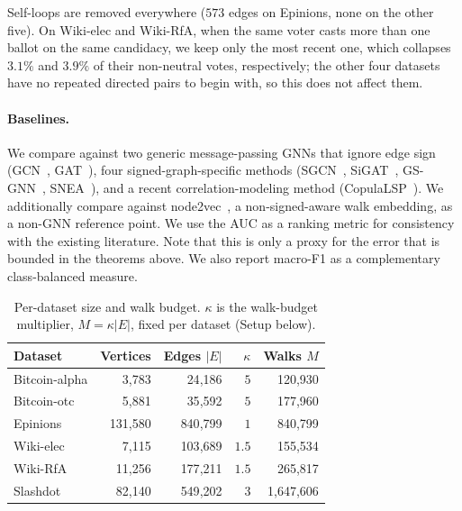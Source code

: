 \documentclass[sigconf]{acmart}
\theoremstyle{plain}
\theoremstyle{definition}
\begin{document}
Self-loops are removed everywhere ($573$ edges on Epinions, none on the other five). On Wiki-elec and Wiki-RfA, when the same voter casts more than one ballot on the same candidacy, we keep only the most recent one, which collapses $3.1\%$ and $3.9\%$ of their non-neutral votes, respectively; the other four datasets have no repeated directed pairs to begin with, so this does not affect them.

\paragraph{Baselines.} We compare against two generic message-passing GNNs that ignore edge sign (GCN~\citep{kipf2017semi}, GAT~\citep{velickovic2018graph}), four signed-graph-specific methods (SGCN~\citep{derr2018signed}, SiGAT~\citep{huang2019signed}, GS-GNN~\citep{liu2021signed}, SNEA~\citep{li2020learning}), and a recent correlation-modeling method (CopulaLSP~\citep{sung2026scalable}). We additionally compare against node2vec~\citep{grover2016node2vec}, a non-signed-aware walk embedding, as a non-GNN reference point. We use the AUC as a ranking metric for consistency with the existing literature. Note that this is only a proxy for the error that is bounded in the theorems above. We also report macro-F1 as a complementary class-balanced measure.

\begin{table}[h!]
\centering
\small
\caption{Per-dataset size and walk budget. $\kappa$ is the walk-budget multiplier, $M=\kappa|E|$, fixed per dataset (Setup below).}
\label{tab:dataset-walks}
\begin{tabular}{lrrrr}
\toprule
Dataset & Vertices & Edges $|E|$ & $\kappa$ & Walks $M$ \\
\midrule
Bitcoin-alpha & 3{,}783 & 24{,}186 & $5$ & 120{,}930 \\
Bitcoin-otc & 5{,}881 & 35{,}592 & $5$ & 177{,}960 \\
Epinions & 131{,}580 & 840{,}799 & $1$ & 840{,}799 \\
Wiki-elec & 7{,}115 & 103{,}689 & $1.5$ & 155{,}534 \\
Wiki-RfA & 11{,}256 & 177{,}211 & $1.5$ & 265{,}817 \\
Slashdot & 82{,}140 & 549{,}202 & $3$ & 1{,}647{,}606 \\
\bottomrule
\end{tabular}
\end{table}
\end{document}
